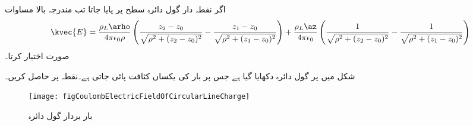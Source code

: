 اگر نقطہ دار گول دائرہ  سطح پر پایا جاتا تب مندرجہ بالا مساوات 
\begin{align*}
\kvec{E}=\frac{\rho_L \arho}{4\pi\epsilon_0 \rho} \left(\frac{z_2-z_0}{\sqrt{\rho^2+(z_2-z_0)^2}}-\frac{z_1-z_0}{\sqrt{\rho^2+(z_1-z_0)^2}}\right)+\frac{\rho_L \az}{4\pi\epsilon_0 } \left(\frac{1}{\sqrt{\rho^2+(z_2-z_0)^2}}-\frac{1}{\sqrt{\rho^2+(z_1-z_0)^2}} \right)
\end{align*}
صورت اختیار کرتا۔

شکل  میں  پر گول دائرہ دکھایا گیا ہے جس پر بار کی یکساں کثافت پائی جاتی ہے۔نقطہ  پر  حاصل کریں۔

\begin{figure}
\centering
\texttt{[image: figCoulombElectricFieldOfCircularLineCharge]}
\caption{بار بردار گول دائرہ}
\label{شکل_کولمب_گول_دائرے_پر_بار}
\end{figure}

